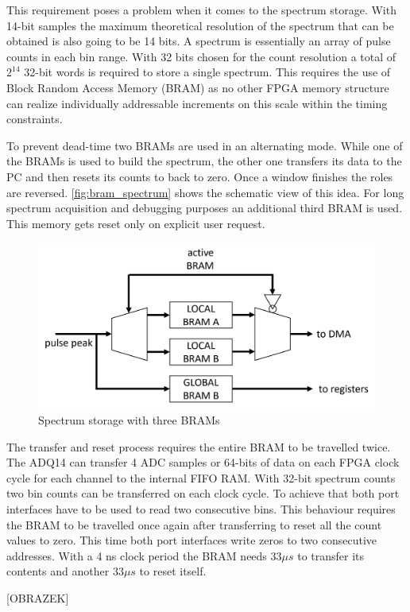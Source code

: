 This requirement poses a problem when it comes to the spectrum storage.
With 14-bit samples the maximum theoretical resolution of the spectrum
that can be obtained is also going to be 14 bits. A spectrum is essentially 
an array of pulse counts in each bin range. With 32 bits chosen 
for the count resolution a total of $2^{14}$ 32-bit words is required to 
store a single spectrum.
This requires the use of Block Random Access Memory (BRAM)
as no other FPGA memory structure can realize
individually addressable increments on this scale within the timing constraints.


To prevent dead-time two BRAMs are used in an alternating mode.
While one of the BRAMs is used to build the spectrum, the other one
transfers its data to the PC and then resets its counts to back to zero.
Once a window finishes the roles are reversed.
\autoref{fig:bram_spectrum} shows the schematic view of this idea. 
For long spectrum acquisition and debugging purposes an additional third BRAM is used. 
This memory gets reset only on explicit user request.

\begin{figure}[H]
  \centering
  \includegraphics[width=\linewidth]{media/bram_spectrum.png}
  \caption{Spectrum storage with three BRAMs}
  \label{fig:bram_spectrum} 
\end{figure}

The transfer and reset process requires the entire BRAM to be travelled twice. 
The ADQ14 can transfer 4 ADC samples or 64-bits of data
on each FPGA clock cycle for each channel to the internal FIFO RAM.
With 32-bit spectrum counts two bin counts can be transferred
on each clock cycle. To achieve that
both port interfaces have to be used to read two consecutive bins.
This behaviour requires the BRAM to be travelled once again after transferring
to reset all the count values to zero. This time both port interfaces
write zeros to two consecutive addresses. With a 4 ns clock period
the BRAM needs 33$\mu s$ to transfer its contents and another 33$\mu s$ to reset itself.

{\Huge [OBRAZEK]}
